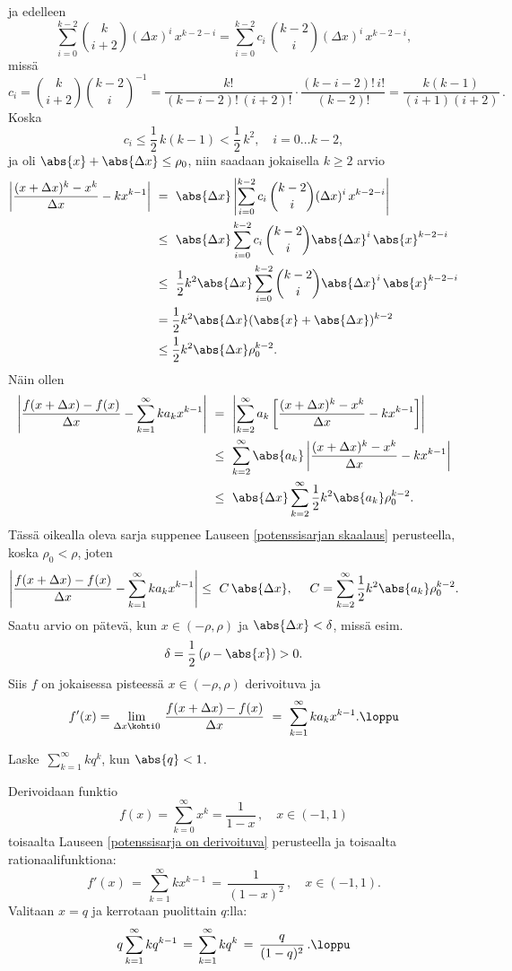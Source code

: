 ja edelleen
\[
\sum_{i=0}^{k-2} \binom{k}{i+2} (\Delta x)^i\,x^{k-2-i} 
                = \sum_{i=0}^{k-2} c_i\,\binom{k-2}{i} (\Delta x)^i\,x^{k-2-i},
\]
missä
\[
c_i = \binom{k}{i+2} \binom{k-2}{i}^{-1} 
    = \frac{k!}{(k-i-2)!\,(i+2)!} \cdot \frac{(k-i-2)!\,i!}{(k-2)!} 
    = \frac{k(k-1)}{(i+1)(i+2)}\,.
\]
Koska
\[
c_i \le \frac{1}{2}\,k(k-1) < \frac{1}{2}\,k^2, \quad i = 0 \ldots k-2,
\]
ja oli $\abs{x}+\abs{\Delta x} \le \rho_0$, niin saadaan jokaisella $k \ge 2$ arvio
\begin{align*}
\left|\frac{(x+\Delta x)^k - x^k}{\Delta x} - kx^{k-1}\right|\ 
 &=\ \abs{\Delta x} \left|\sum_{i=0}^{k-2} c_i\,\binom{k-2}{i} (\Delta x)^i\,x^{k-2-i}\right| \\
 &\le\ \abs{\Delta x} \sum_{i=0}^{k-2} c_i\,\binom{k-2}{i} \abs{\Delta x}^i\,\abs{x}^{k-2-i} \\
 &\le\ \frac{1}{2}k^2\abs{\Delta x} 
               \sum_{i=0}^{k-2} \binom{k-2}{i} \abs{\Delta x}^i\,\abs{x}^{k-2-i} \\
 &= \frac{1}{2}k^2\abs{\Delta x}(\abs{x}+\abs{\Delta x})^{k-2} \\
 &\le \frac{1}{2}k^2\abs{\Delta x}\rho_0^{k-2}.
\end{align*}
Näin ollen
\begin{align*}
\left| \frac{f(x+\Delta x)-f(x)}{\Delta x} - \sum_{k=1}^\infty ka_kx^{k-1} \right|\ 
       &=\ \left|\sum_{k=2}^\infty a_k
                 \left[\frac{(x+\Delta x)^k - x^k}{\Delta x} - kx^{k-1}\right]\right| \\
       &\le\ \sum_{k=2}^\infty \abs{a_k}
             \left|\frac{(x+\Delta x)^k - x^k}{\Delta x} - kx^{k-1}\right| \\
       &\le\ \abs{\Delta x}\sum_{k=2}^\infty \frac{1}{2}k^2\abs{a_k}\rho_0^{k-2}.
\end{align*}
Tässä oikealla oleva sarja suppenee Lauseen \ref{potenssisarjan skaalaus} perusteella, koska
$\rho_0<\rho$, joten
\[
\left|\frac{f(x+\Delta x)-f(x)}{\Delta x} - \sum_{k=1}^\infty ka_kx^{k-1}\right| 
       \le\ C\,\abs{\Delta x}, \quad\ C = \sum_{k=2}^\infty \frac{1}{2}k^2\abs{a_k}\rho_0^{k-2}.
\]
Saatu arvio on pätevä, kun $x \in (-\rho,\rho)$ ja $\abs{\Delta x} < \delta$, missä esim.\ 
\[ 
\delta = \frac{1}{2}\,(\rho-\abs{x}) > 0. 
\]
Siis $f$ on jokaisessa pisteessä $x \in (-\rho,\rho)$ derivoituva ja
\[
f'(x) = \lim_{\Delta x \kohti 0}\,\frac{f(x+\Delta x)-f(x)}{\Delta x}\ 
      =\ \sum_{k=1}^\infty ka_kx^{k-1}. \loppu
\]
\begin{Exa} Laske $\,\sum_{k=1}^\infty k q^k$, kun $\abs{q}<1$. \end{Exa}
\ratk Derivoidaan funktio
\[ 
f(x) = \sum_{k=0}^\infty x^k = \frac{1}{1-x}\,, \quad x \in (-1,1) 
\]
toisaalta Lauseen \ref{potenssisarja on derivoituva} perusteella ja toisaalta 
rationaalifunktiona:
\[ 
f'(x) \,=\, \sum_{k=1}^\infty kx^{k-1} \,=\, \frac{1}{(1-x)^2}\,, \quad x\in(-1,1). 
\]
Valitaan $x=q$ ja kerrotaan puolittain $q$:lla:
\[
q\sum_{k=1}^\infty kq^{k-1} \,=\, \sum_{k=1}^\infty kq^k \,=\, \frac{q}{(1-q)^2}\,. \loppu
\]

